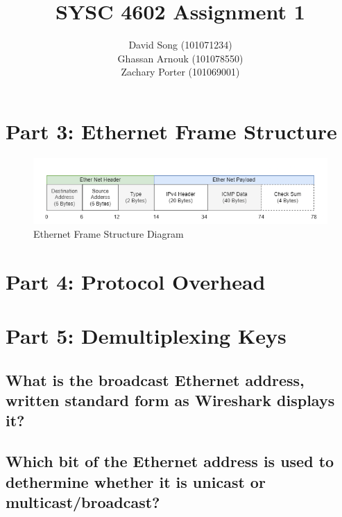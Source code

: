 \documentclass{article}
\begin{document}
    \title  { \textbf{SYSC 4602 Assignment 1} }
    \author {
        David Song (101071234)\\
        Ghassan Arnouk (101078550)\\
        Zachary Porter (101069001)
    }
     
    \maketitle
    
    \clearpage
    \section*{Part 3: Ethernet Frame Structure}
    \begin{figure}[htbp]
        \centering
        \includegraphics[width=\textwidth]{images/assignment3-part3.drawio.png}
        \caption{Ethernet Frame Structure Diagram}
    \end{figure}
    \section*{Part 4: Protocol Overhead}

    \section*{Part 5: Demultiplexing Keys}
    \subsection{What is the broadcast Ethernet address, written standard form as Wireshark displays it?}

    \subsection{Which bit of the Ethernet address is used to dethermine whether it is unicast or multicast/broadcast?}
\end{document}
